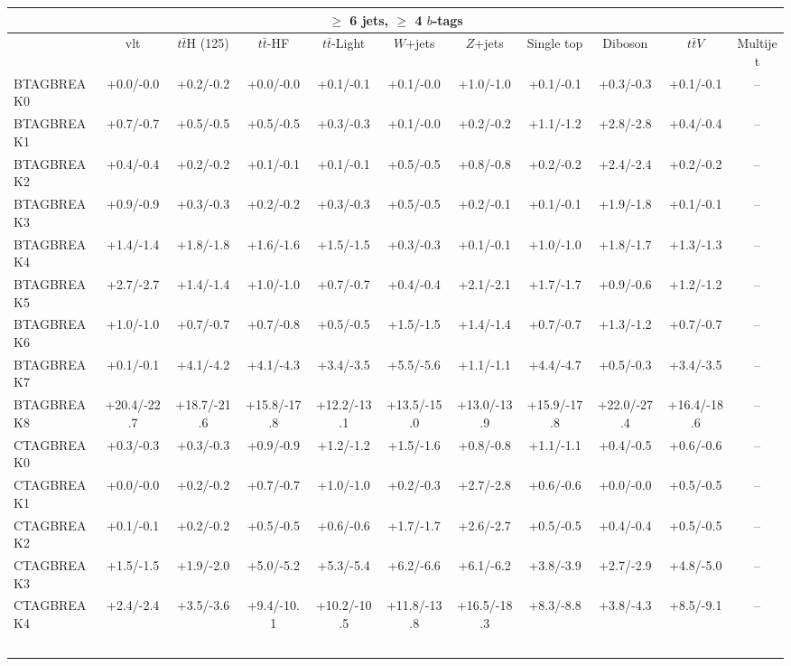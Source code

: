 \begin{tabular}{l*{10}{c}}
\toprule
\multicolumn{11}{c}{$\geq$ 6 jets, $\geq$ 4 $b$-tags}\\
\midrule
 & vlt & $t\bar{t}$H (125) & $t\bar{t}$-HF & $t\bar{t}$-Light & $W$+jets & $Z$+jets & Single top & Diboson & $t\bar{t}$$V$ & Multijet\\
\midrule
BTAGBREAK0 & +0.0/-0.0 & +0.2/-0.2 & +0.0/-0.0 & +0.1/-0.1 & +0.1/-0.0 & +1.0/-1.0 & +0.1/-0.1 & +0.3/-0.3 & +0.1/-0.1 & --\\
BTAGBREAK1 & +0.7/-0.7 & +0.5/-0.5 & +0.5/-0.5 & +0.3/-0.3 & +0.1/-0.0 & +0.2/-0.2 & +1.1/-1.2 & +2.8/-2.8 & +0.4/-0.4 & --\\
BTAGBREAK2 & +0.4/-0.4 & +0.2/-0.2 & +0.1/-0.1 & +0.1/-0.1 & +0.5/-0.5 & +0.8/-0.8 & +0.2/-0.2 & +2.4/-2.4 & +0.2/-0.2 & --\\
BTAGBREAK3 & +0.9/-0.9 & +0.3/-0.3 & +0.2/-0.2 & +0.3/-0.3 & +0.5/-0.5 & +0.2/-0.1 & +0.1/-0.1 & +1.9/-1.8 & +0.1/-0.1 & --\\
BTAGBREAK4 & +1.4/-1.4 & +1.8/-1.8 & +1.6/-1.6 & +1.5/-1.5 & +0.3/-0.3 & +0.1/-0.1 & +1.0/-1.0 & +1.8/-1.7 & +1.3/-1.3 & --\\
BTAGBREAK5 & +2.7/-2.7 & +1.4/-1.4 & +1.0/-1.0 & +0.7/-0.7 & +0.4/-0.4 & +2.1/-2.1 & +1.7/-1.7 & +0.9/-0.6 & +1.2/-1.2 & --\\
BTAGBREAK6 & +1.0/-1.0 & +0.7/-0.7 & +0.7/-0.8 & +0.5/-0.5 & +1.5/-1.5 & +1.4/-1.4 & +0.7/-0.7 & +1.3/-1.2 & +0.7/-0.7 & --\\
BTAGBREAK7 & +0.1/-0.1 & +4.1/-4.2 & +4.1/-4.3 & +3.4/-3.5 & +5.5/-5.6 & +1.1/-1.1 & +4.4/-4.7 & +0.5/-0.3 & +3.4/-3.5 & --\\
BTAGBREAK8 & +20.4/-22.7 & +18.7/-21.6 & +15.8/-17.8 & +12.2/-13.1 & +13.5/-15.0 & +13.0/-13.9 & +15.9/-17.8 & +22.0/-27.4 & +16.4/-18.6 & --\\
CTAGBREAK0 & +0.3/-0.3 & +0.3/-0.3 & +0.9/-0.9 & +1.2/-1.2 & +1.5/-1.6 & +0.8/-0.8 & +1.1/-1.1 & +0.4/-0.5 & +0.6/-0.6 & --\\
CTAGBREAK1 & +0.0/-0.0 & +0.2/-0.2 & +0.7/-0.7 & +1.0/-1.0 & +0.2/-0.3 & +2.7/-2.8 & +0.6/-0.6 & +0.0/-0.0 & +0.5/-0.5 & --\\
CTAGBREAK2 & +0.1/-0.1 & +0.2/-0.2 & +0.5/-0.5 & +0.6/-0.6 & +1.7/-1.7 & +2.6/-2.7 & +0.5/-0.5 & +0.4/-0.4 & +0.5/-0.5 & --\\
CTAGBREAK3 & +1.5/-1.5 & +1.9/-2.0 & +5.0/-5.2 & +5.3/-5.4 & +6.2/-6.6 & +6.1/-6.2 & +3.8/-3.9 & +2.7/-2.9 & +4.8/-5.0 & --\\
CTAGBREAK4 & +2.4/-2.4 & +3.5/-3.6 & +9.4/-10.1 & +10.2/-10.5 & +11.8/-13.8 & +16.5/-18.3 & +8.3/-8.8 & +3.8/-4.3 & +8.5/-9.1 & --\\
$$
\end{tabular}
